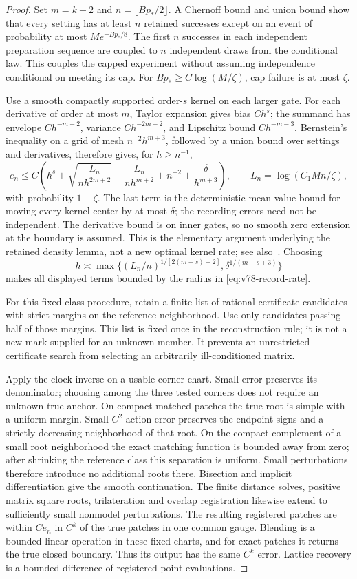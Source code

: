 \begin{proof}
Set $m=k+2$ and $n=\lfloor Bp_*/2\rfloor$.  A Chernoff bound and
union bound show that every setting has at least $n$ retained successes
except on an event of probability at most $M e^{-Bp_*/8}$.  The first
$n$ successes in each independent preparation sequence are coupled to
$n$ independent draws from the conditional law.  This couples the
capped experiment without assuming independence conditional on meeting
its cap.  For $Bp_*\ge C\log(M/\zeta)$, cap failure is at most
$\zeta$.

Use a smooth compactly supported order-$s$ kernel on each larger gate.
For each derivative of order at most $m$, Taylor expansion gives bias
$Ch^s$; the summand has envelope $Ch^{-m-2}$, variance
$Ch^{-2m-2}$, and Lipschitz bound $Ch^{-m-3}$.  Bernstein's inequality
on a grid of mesh $n^{-2}h^{m+3}$, followed by a union bound over
settings and derivatives, therefore gives, for $h\ge n^{-1}$,
\[
 e_n\le C\left(h^s+
 \sqrt{\frac{L_n}{nh^{2m+2}}}+\frac{L_n}{nh^{m+2}}
       +n^{-2}+\frac{\delta}{h^{m+3}}\right),\qquad
 L_n=\log(C_1Mn/\zeta),
\]
with probability $1-\zeta$.  The last term is the deterministic mean
value bound for moving every kernel center by at most $\delta$; the
recording errors need not be independent.  The derivative bound is on
inner gates, so no smooth zero extension at the boundary is assumed.
This is the elementary argument underlying the retained density lemma,
not a new optimal kernel rate; see also~\cite{GineGuillou2002}.
Choosing
\[
 h\asymp\max\{(L_n/n)^{1/[2(m+s)+2]},\delta^{1/(m+s+3)}\}
\]
makes all displayed terms bounded by the radius in
\eqref{eq:v78-record-rate}.

For this fixed-class procedure, retain a finite list of rational
certificate candidates with strict margins on the reference neighborhood.
Use only candidates passing half of those margins.  This list is fixed
once in the reconstruction rule; it is not a new mark supplied for an
unknown member.  It prevents an unrestricted certificate search from
selecting an arbitrarily ill-conditioned matrix.

Apply the clock inverse on a usable corner chart.  Small error preserves
its denominator; choosing among the three tested corners does not require
an unknown true anchor.  On compact matched patches the true root is
simple with a uniform margin.  Small $C^2$ action error preserves the
endpoint signs and a strictly decreasing neighborhood of that root.
On the compact complement of a small root neighborhood the exact matching function is bounded away from zero; after shrinking the reference class this separation is uniform.  Small perturbations therefore introduce no additional roots there.  Bisection and implicit differentiation give the smooth continuation.
The finite distance solves, positive matrix square roots, trilateration
and overlap registration likewise extend to sufficiently small
nonmodel perturbations.  The resulting registered patches are within
$Ce_n$ in $C^k$ of the true patches in one common gauge.  Blending is a
bounded linear operation in these fixed charts, and for exact patches
it returns the true closed boundary.  Thus its output has the same
$C^k$ error.  Lattice recovery is a bounded difference of registered
point evaluations.


\end{proof}
